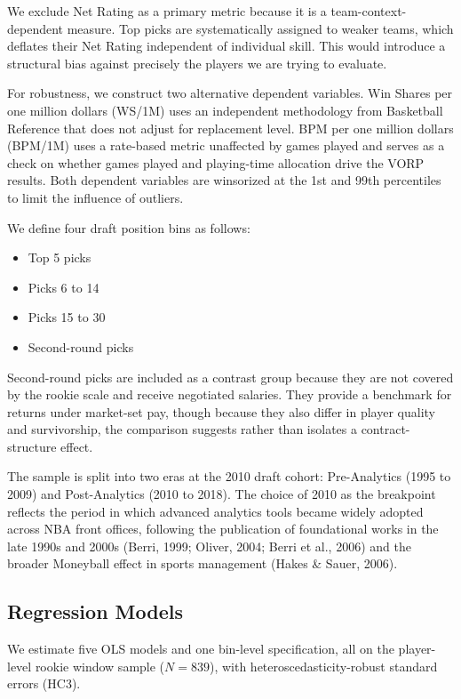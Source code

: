 \documentclass[12pt,letterpaper]{article}
\begin{document}
We exclude Net Rating as a primary metric because it is a team-context-dependent measure. Top picks are systematically assigned to weaker teams, which deflates their Net Rating independent of individual skill. This would introduce a structural bias against precisely the players we are trying to evaluate.

For robustness, we construct two alternative dependent variables. Win Shares per one million dollars (WS/1M) uses an independent methodology from Basketball Reference that does not adjust for replacement level. BPM per one million dollars (BPM/1M) uses a rate-based metric unaffected by games played and serves as a check on whether games played and playing-time allocation drive the VORP results. Both dependent variables are winsorized at the 1st and 99th percentiles to limit the influence of outliers.


We define four draft position bins as follows:
\begin{itemize}[noitemsep]
  \item Top 5 picks
  \item Picks 6 to 14
  \item Picks 15 to 30
  \item Second-round picks
\end{itemize}

Second-round picks are included as a contrast group because they are not covered by the rookie scale and receive negotiated salaries. They provide a benchmark for returns under market-set pay, though because they also differ in player quality and survivorship, the comparison suggests rather than isolates a contract-structure effect.

The sample is split into two eras at the 2010 draft cohort: Pre-Analytics (1995 to 2009) and Post-Analytics (2010 to 2018). The choice of 2010 as the breakpoint reflects the period in which advanced analytics tools became widely adopted across NBA front offices, following the publication of foundational works in the late 1990s and 2000s (Berri, 1999; Oliver, 2004; Berri et al., 2006) and the broader Moneyball effect in sports management (Hakes \& Sauer, 2006).


\subsection{Regression Models}

We estimate five OLS models and one bin-level specification, all on the player-level rookie window sample ($N = 839$), with heteroscedasticity-robust standard errors (HC3).
\end{document}
